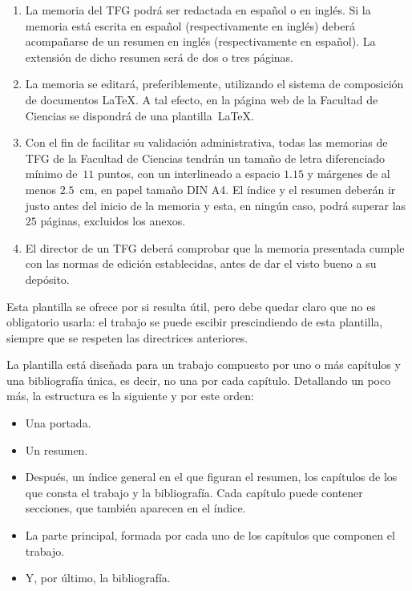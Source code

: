\documentclass[11pt]{book}
\theoremstyle{plain} %
\theoremstyle{definition} %
\begin{document}
\begin{enumerate}
\item La memoria del TFG podrá ser redactada en español o en inglés. Si la 
memoria está escrita en español (respectivamente en inglés) deberá acompañarse de 
un resumen en inglés (respectivamente en español). La extensión de dicho resumen 
será de dos o tres páginas.

\item La memoria se editará, preferiblemente, utilizando el sistema de 
composición de documentos {\LaTeX}. A tal efecto, en la página web de la Facultad 
de Ciencias se dispondrá de una plantilla~{\LaTeX}.

\item Con el fin de facilitar su validación administrativa, todas las memorias de 
TFG de la Facultad de Ciencias tendrán un tamaño de letra diferenciado mínimo 
de~$11$ puntos, con un interlineado a espacio $1.15$ y márgenes de al menos 
$2.5$~cm, en papel tamaño DIN A4. El índice y el resumen deberán ir justo antes 
del inicio de la memoria y esta, en ningún caso, podrá superar las $25$ páginas, 
excluidos los anexos.

\item El director de un TFG deberá comprobar que la memoria presentada cumple con 
las normas de edición establecidas, antes de dar el visto bueno a su depósito.
\end{enumerate}

Esta plantilla se ofrece por si resulta útil, pero 
debe quedar claro que no es obligatorio usarla: el trabajo se puede escibir prescindiendo de esta plantilla, siempre que se respeten las directrices anteriores.

La plantilla está diseñada para un trabajo compuesto por uno o más capítulos y una 
bibliografía única, es decir, no una por cada capítulo. Detallando un poco más, 
la estructura es la siguiente y por este orden:
\begin{itemize}
\item Una portada.
\item Un resumen.
\item Después, un índice general en el que figuran el resumen, los capítulos de 
los que consta el trabajo y la bibliografía. 
Cada capítulo puede contener secciones, que también aparecen en el índice.
\item La parte principal, formada por cada uno de los capítulos que componen el 
trabajo.
\item Y, por último, la bibliografía.
\end{itemize}
\end{document}

